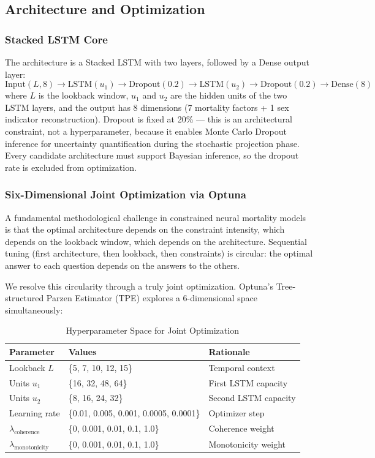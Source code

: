 \documentclass[11pt,a4paper]{article}
\begin{document}
\subsection{Architecture and Optimization}

\subsubsection{Stacked LSTM Core}

The architecture is a Stacked LSTM with two layers, followed by a Dense output layer:
$$\text{Input}(L, 8) \to \text{LSTM}(u_1) \to \text{Dropout}(0.2) \to \text{LSTM}(u_2) \to \text{Dropout}(0.2) \to \text{Dense}(8)$$
where $L$ is the lookback window, $u_1$ and $u_2$ are the hidden units of the two LSTM layers, and the output has 8 dimensions (7 mortality factors + 1 sex indicator reconstruction). Dropout is fixed at 20\% --- this is an architectural constraint, not a hyperparameter, because it enables Monte Carlo Dropout inference \cite{gal2016dropout} for uncertainty quantification during the stochastic projection phase. Every candidate architecture must support Bayesian inference, so the dropout rate is excluded from optimization.

\subsubsection{Six-Dimensional Joint Optimization via Optuna}

A fundamental methodological challenge in constrained neural mortality models is that the optimal architecture depends on the constraint intensity, which depends on the lookback window, which depends on the architecture. Sequential tuning (first architecture, then lookback, then constraints) is circular: the optimal answer to each question depends on the answers to the others.

We resolve this circularity through a truly joint optimization. Optuna's Tree-structured Parzen Estimator (TPE) \cite{optuna2019} explores a 6-dimensional space simultaneously:

\begin{table}[H]
\centering
\caption{Hyperparameter Space for Joint Optimization}
\label{tab:hyperspace}
\begin{tabular}{@{}lll@{}}
\toprule
Parameter & Values & Rationale \\ \midrule
Lookback $L$ & \{5, 7, 10, 12, 15\} & Temporal context \\
Units $u_1$ & \{16, 32, 48, 64\} & First LSTM capacity \\
Units $u_2$ & \{8, 16, 24, 32\} & Second LSTM capacity \\
Learning rate & \{0.01, 0.005, 0.001, 0.0005, 0.0001\} & Optimizer step \\
$\lambda_{\text{coherence}}$ & \{0, 0.001, 0.01, 0.1, 1.0\} & Coherence weight \\
$\lambda_{\text{monotonicity}}$ & \{0, 0.001, 0.01, 0.1, 1.0\} & Monotonicity weight \\
\bottomrule
\end{tabular}
\end{table}
\end{document}
